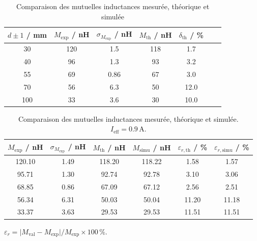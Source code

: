\documentclass[a4paper,10pt]{article}
\begin{document}
\begin{table}[H]
  \centering
  \caption{Comparaison des mutuelles inductances mesurée, théorique et simulée}
  \begin{tabular}{
    S[table-format=3.0]
    S[table-format=3.0]
    S[table-format=1.2]
    S[table-format=3.0]
    S[table-format=2.1]
    S[table-format=3.0]
    S[table-format=2.1]
  }

    \toprule

    {$d \pm 1$ / mm} &
    {$M_\mathrm{exp}$ / nH} &
    {$\sigma_{M_\mathrm{exp}}$ / nH} &
    {$M_\mathrm{th}$ / nH} &
    {$\delta_\mathrm{th}$ / \%} \\

    \midrule

    30  & 120 & 1.5  & 118 &  1.7\\
    40  &  96 & 1.3  &  93 &  3.2 \\
    55  &  69 & 0.86 &  67 &  3.0  \\
    70  &  56 & 6.3  &  50 & 12.0  \\
    100 &  33 & 3.6  &  30 & 10.0 \\

    \bottomrule

  \end{tabular}
\end{table}


\begin{table}[H]
\centering

\caption{
Comparaison des mutuelles inductances mesurée, théorique et simulée.
$I_\mathrm{eff} = 0.9\,\mathrm{A}$.
}

\label{tab:mutual_compare}

\small

\begin{tabular}{
S[table-format=3.2]
S[table-format=1.2]
S[table-format=3.2]
S[table-format=3.2]
S[table-format=2.2]
S[table-format=2.2]
}

\toprule

{$M_\mathrm{exp}$ / nH} &
{$\sigma_{M_\mathrm{exp}}$ / nH} &
{$M_\mathrm{th}$ / nH} &
{$M_\mathrm{simu}$ / nH} &
{$\varepsilon_{r,\mathrm{th}}$ / \%} &
{$\varepsilon_{r,\mathrm{simu}}$ / \%} \\

\midrule

120.10 & 1.49 & 118.20 & 118.22 & 1.58 & 1.57 \\
 95.71 & 1.30 &  92.74 &  92.78 & 3.10 & 3.06 \\
 68.85 & 0.86 &  67.09 &  67.12 & 2.56 & 2.51 \\
 56.34 & 6.31 &  50.03 &  50.04 & 11.20 & 11.18 \\
 33.37 & 3.63 &  29.53 &  29.53 & 11.51 & 11.51 \\

\bottomrule

\end{tabular}

\smallskip
\raggedright
\footnotesize
$\varepsilon_{r} =
\lvert M_\mathrm{val} - M_\mathrm{exp} \rvert / M_\mathrm{exp} \times 100\,\%$.

\end{table}
\end{document}
